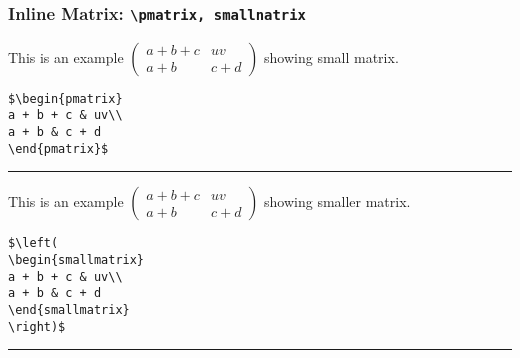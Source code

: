 \subsubsection{Inline Matrix: \texttt{\large \textbackslash pmatrix, smallnatrix} }
%
This is an example $\begin{pmatrix}
a + b + c & uv\\
a + b & c + d
\end{pmatrix}$ 
showing small matrix.
%
\begin{verbatim}
$\begin{pmatrix}
a + b + c & uv\\
a + b & c + d
\end{pmatrix}$
\end{verbatim}
%
\begin{center}{\rule{10cm}{0.5pt}}\end{center}
%
This is an example $\left(
\begin{smallmatrix}
a + b + c & uv\\
a + b & c + d
\end{smallmatrix}
\right)$ showing smaller matrix.
%
%
\begin{verbatim}
$\left(
\begin{smallmatrix}
a + b + c & uv\\ 
a + b & c + d    
\end{smallmatrix} 
\right)$ 
\end{verbatim}
%
\begin{center}{\rule{10cm}{0.5pt}}\end{center}
%
%
\begin{center}\end{center}
